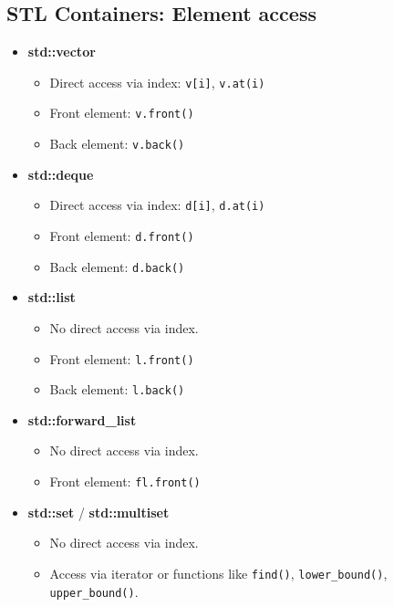 \documentclass{report}
\begin{document}
   \pagebreak 
   \subsection{STL Containers: Element access}
\begin{itemize}
    \item \textbf{std::vector}
    \begin{itemize}
        \item Direct access via index: \texttt{v[i]}, \texttt{v.at(i)}
        \item Front element: \texttt{v.front()}
        \item Back element: \texttt{v.back()}
    \end{itemize}
    
    \item \textbf{std::deque}
    \begin{itemize}
        \item Direct access via index: \texttt{d[i]}, \texttt{d.at(i)}
        \item Front element: \texttt{d.front()}
        \item Back element: \texttt{d.back()}
    \end{itemize}
    
    \item \textbf{std::list}
    \begin{itemize}
        \item No direct access via index.
        \item Front element: \texttt{l.front()}
        \item Back element: \texttt{l.back()}
    \end{itemize}
    
    \item \textbf{std::forward\_list}
    \begin{itemize}
        \item No direct access via index.
        \item Front element: \texttt{fl.front()}
    \end{itemize}
    
    \item \textbf{std::set} / \textbf{std::multiset}
    \begin{itemize}
        \item No direct access via index.
        \item Access via iterator or functions like \texttt{find()}, \texttt{lower\_bound()}, \texttt{upper\_bound()}.
    \end{itemize}
    

\end{itemize}
\end{document}
